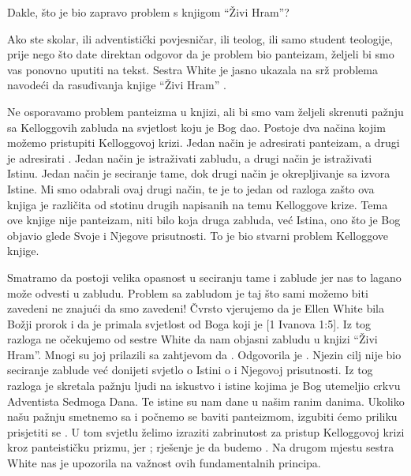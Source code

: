 Dakle, što je bio zapravo problem s knjigom “Živi Hram”?

Ako ste skolar, ili adventistički povjesničar, ili teolog, ili samo student teologije, prije nego što date direktan odgovor da je problem bio panteizam, željeli bi smo vas ponovno uputiti na tekst. Sestra White je jasno ukazala na srž problema navodeći da rasuđivanja knjige “Živi Hram” .

Ne osporavamo problem panteizma u knjizi, ali bi smo vam željeli skrenuti pažnju sa Kelloggovih zabluda na svjetlost koju je Bog dao. Postoje dva načina kojim možemo pristupiti Kelloggovoj krizi. Jedan način je adresirati panteizam, a drugi je adresirati . Jedan način je istraživati zabludu, a drugi način je istraživati Istinu. Jedan način je seciranje tame, dok drugi način je okrepljivanje sa izvora Istine. Mi smo odabrali ovaj drugi način, te je to jedan od razloga zašto ova knjiga je različita od stotinu drugih napisanih na temu Kelloggove krize. Tema ove knjige nije panteizam, niti bilo koja druga zabluda, već Istina, ono što je Bog objavio glede Svoje  i Njegove prisutnosti. To je bio stvarni problem Kelloggove knjige.

Smatramo da postoji velika opasnost u seciranju tame i zablude jer nas to lagano može odvesti u zabludu. Problem sa zabludom je taj što sami možemo biti zavedeni ne znajući da smo zavedeni! Čvrsto vjerujemo da je Ellen White bila Božji prorok i da je primala svjetlost od Boga koji je [1 Ivanova 1:5]. Iz tog razloga ne očekujemo od sestre White da nam objasni zabludu u knjizi “Živi Hram”. Mnogi su joj prilazili sa zahtjevom da . Odgovorila je . Njezin cilj nije bio seciranje zablude već donijeti svjetlo o Istini o  i Njegovoj prisutnosti. Iz tog razloga je skretala pažnju ljudi na iskustvo i istine kojima je Bog utemeljio crkvu Adventista Sedmoga Dana. Te istine su nam dane u našim ranim danima. Ukoliko našu pažnju smetnemo sa  i počnemo se baviti panteizmom, izgubiti ćemo priliku prisjetiti se . U tom svjetlu želimo izraziti zabrinutost za pristup Kelloggovoj krizi kroz panteističku prizmu, jer ; rješenje je da budemo . Na drugom mjestu sestra White nas je upozorila na važnost ovih fundamentalnih principa.

